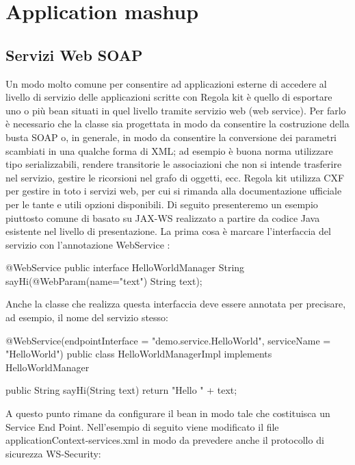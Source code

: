 \chapter{Application mashup}

\section{Servizi Web SOAP}
Un modo molto comune per consentire ad applicazioni esterne di accedere al livello di servizio delle applicazioni scritte con Regola kit è quello di esportare uno o più bean situati in quel livello tramite servizio web (web service). Per farlo è necessario che la classe sia progettata in modo da consentire la costruzione della busta SOAP o, in generale, in modo da consentire la conversione dei parametri scambiati in una qualche forma di XML; ad esempio è buona norma utilizzare tipo serializzabili, rendere transitorie le associazioni che non si intende trasferire nel servizio, gestire le ricorsioni nel grafo di oggetti, ecc.
Regola kit utilizza CXF per gestire in toto i servizi web, per cui si rimanda alla documentazione ufficiale per le tante e utili opzioni disponibili. Di seguito presenteremo un esempio piuttosto comune di basato su JAX-WS realizzato a partire da codice Java esistente nel livello di presentazione. La prima cosa è marcare l'interfaccia del servizio con l'annotazione WebService :

\begin{java}
@WebService
public interface HelloWorldManager {
    String sayHi(@WebParam(name="text") String text);
}
\end{java}


Anche la classe che realizza questa interfaccia deve essere annotata per precisare, ad esempio, il nome del servizio stesso:

\begin{java}
@WebService(endpointInterface = "demo.service.HelloWorld", 
            serviceName = "HelloWorld")
public class HelloWorldManagerImpl implements HelloWorldManager {

    public String sayHi(String text) {
        return "Hello " + text;
    }

}
\end{java}


 A questo punto rimane da configurare il bean in modo tale che costituisca un Service End Point. Nell'esempio di seguito viene modificato il file applicationContext-services.xml in modo da prevedere anche il protocollo di sicurezza WS-Security:


